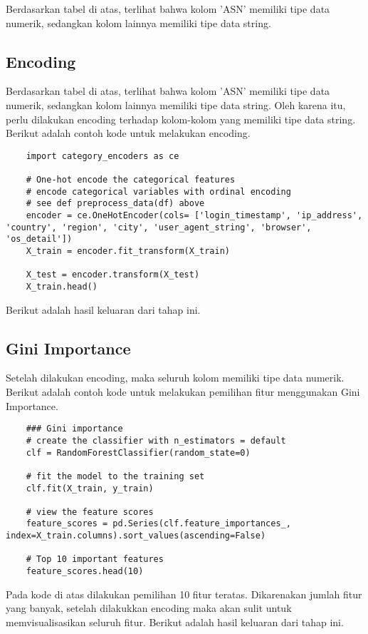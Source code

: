         Berdasarkan tabel di atas, terlihat bahwa kolom 'ASN' memiliki tipe data numerik, sedangkan kolom lainnya memiliki tipe data string.


\subsection{Encoding}
Berdasarkan tabel di atas, terlihat bahwa kolom 'ASN' memiliki tipe data numerik, sedangkan kolom lainnya memiliki tipe data string. Oleh karena itu, perlu dilakukan encoding terhadap kolom-kolom yang memiliki tipe data string. Berikut adalah contoh kode untuk melakukan encoding.

\begin{lstlisting}
    import category_encoders as ce

    # One-hot encode the categorical features
    # encode categorical variables with ordinal encoding
    # see def preprocess_data(df) above
    encoder = ce.OneHotEncoder(cols= ['login_timestamp', 'ip_address', 'country', 'region', 'city', 'user_agent_string', 'browser', 'os_detail'])
    X_train = encoder.fit_transform(X_train)
    
    X_test = encoder.transform(X_test)
    X_train.head()
    \end{lstlisting}

    Berikut adalah hasil keluaran dari tahap ini.

\subsection{Gini Importance}
Setelah dilakukan encoding, maka seluruh kolom memiliki tipe data numerik. Berikut adalah contoh kode untuk melakukan pemilihan fitur menggunakan Gini Importance.

\begin{lstlisting}
    ### Gini importance 
    # create the classifier with n_estimators = default
    clf = RandomForestClassifier(random_state=0)

    # fit the model to the training set
    clf.fit(X_train, y_train)

    # view the feature scores
    feature_scores = pd.Series(clf.feature_importances_, index=X_train.columns).sort_values(ascending=False)
    
    # Top 10 important features
    feature_scores.head(10) 
    \end{lstlisting}

    Pada kode di atas dilakukan pemilihan 10 fitur teratas. Dikarenakan jumlah fitur yang banyak, setelah dilakukkan encoding maka akan sulit untuk memvisualisasikan seluruh fitur.
    Berikut adalah hasil keluaran dari tahap ini.

